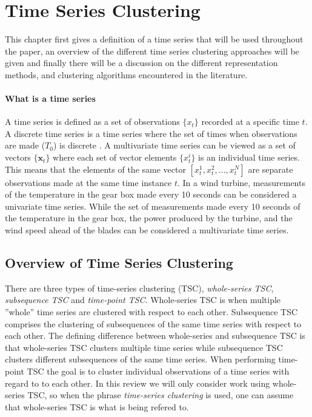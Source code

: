 \chapter{Time Series Clustering}

This chapter first gives a definition of a time series that will be used throughout the paper, an overview of the different time series clustering approaches will be given and finally there will be a discussion on the different representation methods, and clustering algorithms encountered in the literature. 

\subsubsection*{What is a time series} 
A time series is defined as a set of observations $\{x_t\}$ recorded at a specific time $t$. 
A discrete time series is a time series where the set of times when observations are made ($T_0$) is discrete \cite{brockwell_davis_advanced}. 
A multivariate time series can be viewed as a set of vectors $\{\mathbf{x}_t\}$ where each set of vector elements $\{x^i_t\}$ is an individual time series. 
This means that the elements of the same vector $[x^1_t, x^2_t,...,x^N_t]$ are separate observations made at the same time instance $t$. 
In a wind turbine, measurements of the temperature in the gear box made every 10 seconds can be considered a univariate time series. 
While the set of measurements made every 10 seconds of the temperature in the gear box, the power produced by the turbine, and the wind speed ahead of the blades can be considered a multivariate time series. \bigskip

\section{Overview of Time Series Clustering}
There are three types of time-series clustering (TSC), \textit{whole-series TSC}, \textit{subsequence TSC} and \textit{time-point TSC}. 
Whole-series TSC is when multiple ''whole'' time series are clustered with respect to each other. 
Subsequence TSC comprises the clustering of subsequences of the same time series with respect to each other. 
The defining difference between whole-series and subsequence TSC is that whole-series TSC clusters multiple time series while subsequence TSC clusters different subsequences of the same time series. 
When performing time-point TSC the goal is to cluster individual observations of a time series with regard to to each other. 
In this review we will only consider work using whole-series TSC, so when the phrase \textit{time-series clustering} is used, one can assume that whole-series TSC is what is being refered to. \bigskip

